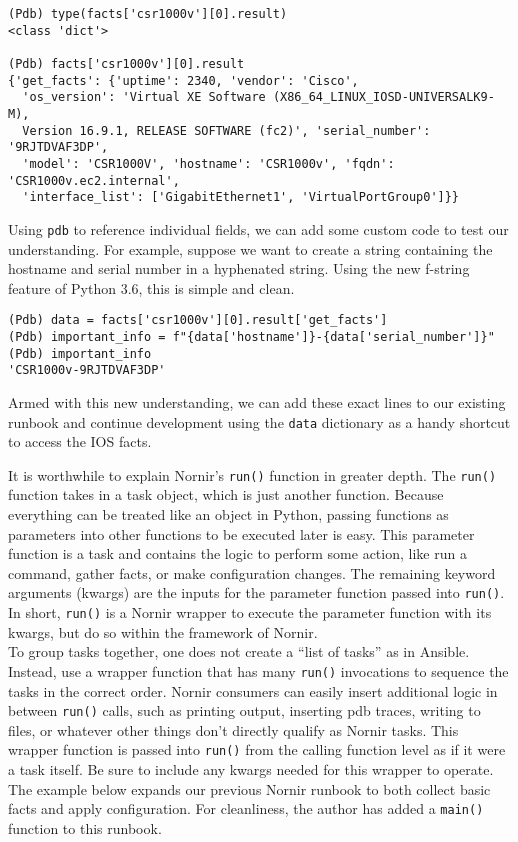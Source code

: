\begin{verbatim}
(Pdb) type(facts['csr1000v'][0].result)
<class 'dict'>

(Pdb) facts['csr1000v'][0].result
{'get_facts': {'uptime': 2340, 'vendor': 'Cisco',
  'os_version': 'Virtual XE Software (X86_64_LINUX_IOSD-UNIVERSALK9-M),
  Version 16.9.1, RELEASE SOFTWARE (fc2)', 'serial_number': '9RJTDVAF3DP',
  'model': 'CSR1000V', 'hostname': 'CSR1000v', 'fqdn': 'CSR1000v.ec2.internal',
  'interface_list': ['GigabitEthernet1', 'VirtualPortGroup0']}}
\end{verbatim}

Using \verb|pdb| to reference individual fields, we can add some custom code
to test our understanding. For example, suppose we want to create a string
containing the hostname and serial number in a hyphenated string. Using the
new f-string feature of Python 3.6, this is simple and clean.

\begin{verbatim}
(Pdb) data = facts['csr1000v'][0].result['get_facts']
(Pdb) important_info = f"{data['hostname']}-{data['serial_number']}"
(Pdb) important_info
'CSR1000v-9RJTDVAF3DP'
\end{verbatim}

Armed with this new understanding, we can add these exact lines to our
existing runbook and continue development using the \verb|data| dictionary as
a handy shortcut to access the IOS facts.

It is worthwhile to explain Nornir's \verb|run()| function in greater depth. The
\verb|run()| function takes in a task object, which is just another function. Because
everything can be treated like an object in Python, passing functions as
parameters into other functions to be executed later is easy. This parameter
function is a task and contains the logic to perform some action, like run a
command, gather facts, or make configuration changes. The remaining keyword
arguments (kwargs) are the inputs for the parameter function passed into
\verb|run()|. In short, \verb|run()| is a Nornir wrapper to execute the
parameter function with its kwargs, but do so within the framework of Nornir. \\

To group tasks together, one does not create a ``list of tasks'' as in
Ansible. Instead, use a wrapper function that has many \verb|run()| invocations to
sequence the tasks in the correct order. Nornir consumers can easily insert
additional logic in between \verb|run()| calls, such as printing output, inserting
pdb traces, writing to files, or whatever other things don't directly qualify
as Nornir tasks. This wrapper function is passed into \verb|run()| from the calling
function level as if it were a task itself. Be sure to include any kwargs
needed for this wrapper to operate. The example below expands our previous
Nornir runbook to both collect basic facts and apply configuration. For
cleanliness, the author has added a \verb|main()| function to this runbook. \\

